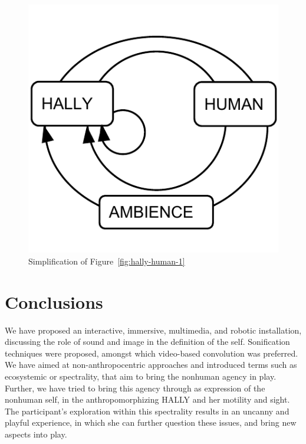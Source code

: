 \documentclass{nime-alternate}
\begin{document}
\begin{figure}[htbp]
    \centering
        \includegraphics[width=0.5\columnwidth]{hally-human-2}
    \caption{Simplification of Figure~\ref{fig:hally-human-1}}
    \label{fig:hally-human-2}
\end{figure}

\section{Conclusions}
We have proposed an interactive, immersive, multimedia, and robotic installation, discussing the role of sound and image in the definition of the self. Sonification techniques were proposed, amongst which video-based convolution was preferred. We have aimed at non-anthropocentric approaches and introduced terms such as ecosystemic or spectrality, that aim to bring the nonhuman agency in play. Further, we have tried to bring this agency through as expression of the nonhuman self, in the anthropomorphizing HALLY and her motility and sight. The participant's exploration within this spectrality results in an uncanny and playful experience, in which she can further question these issues, and bring new aspects into play.


 
\end{document}
